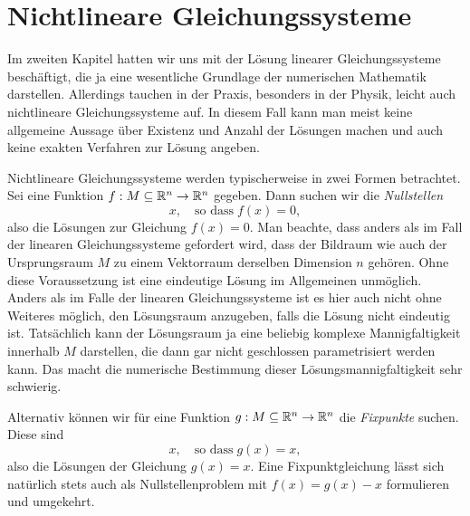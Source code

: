 % 

\chapter{Nichtlineare Gleichungssysteme}

Im zweiten Kapitel hatten wir uns mit der Lösung linearer
Gleichungssysteme beschäftigt, die ja eine wesentliche Grundlage der
numerischen Mathematik darstellen. Allerdings tauchen in der Praxis,
besonders in der Physik, leicht auch nichtlineare Gleichungssysteme
auf. In diesem Fall kann man meist keine allgemeine Aussage über
Existenz und Anzahl der Lösungen machen und auch keine exakten
Verfahren zur Lösung angeben.

Nichtlineare Gleichungssysteme werden typischerweise in zwei Formen
betrachtet. Sei eine Funktion $f:M\subseteq\mathbb{R}^n\to\mathbb{R}^n$ gegeben. Dann suchen
wir die \emph{Nullstellen}
\begin{equation}
  \label{eq:nullstellen}
  x, \quad\text{so dass}\; f(x) = 0,
\end{equation}
also die Lösungen zur Gleichung $f(x) = 0$. Man beachte, dass anders
als im Fall der linearen Gleichungssysteme gefordert wird, dass der
Bildraum wie auch der Ursprungsraum $M$ zu einem Vektorraum derselben
Dimension $n$ gehören. Ohne diese Voraussetzung ist eine eindeutige
Lösung im Allgemeinen unmöglich. Anders als im Falle der linearen
Gleichungssysteme ist es hier auch nicht ohne Weiteres möglich, den
Lösungsraum anzugeben, falls die Lösung nicht eindeutig
ist. Tatsächlich kann der Lösungsraum ja eine beliebig komplexe
Mannigfaltigkeit innerhalb $M$ darstellen, die dann gar nicht
geschlossen parametrisiert werden kann. Das macht die numerische
Bestimmung dieser Lösungsmannigfaltigkeit sehr schwierig.

Alternativ können wir für eine Funktion $g:M\subseteq\mathbb{R}^n\to\mathbb{R}^n$ die
\emph{Fixpunkte} suchen. Diese sind
\begin{equation}
  \label{eq:fixpunkt}
  x, \quad\text{so dass}\; g(x) = x,
\end{equation}
also die Lösungen der Gleichung $g(x) = x$. Eine Fixpunktgleichung
lässt sich natürlich stets auch als Nullstellenproblem mit $f(x) =
g(x) - x$ formulieren und umgekehrt.

